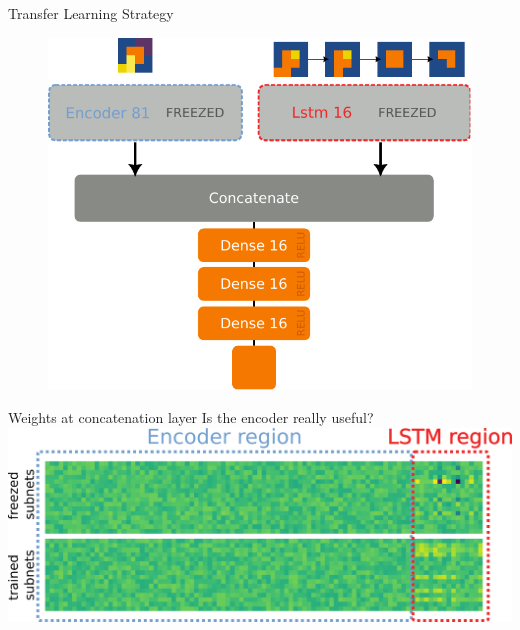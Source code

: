 \documentclass{beamer}
\begin{document}
\begin{frame}{Transfer Learning Strategy}
    \begin{figure}
        \centering
        \includegraphics[width=.7\linewidth]{figures/freezetraining_2.pdf}
    \end{figure}
\end{frame}


\begin{frame}{Weights at concatenation layer}
    Is the encoder really useful?
    \vfill
    \includegraphics[width=\linewidth]{figures/weights_comparison.png}
\end{frame}
\end{document}
